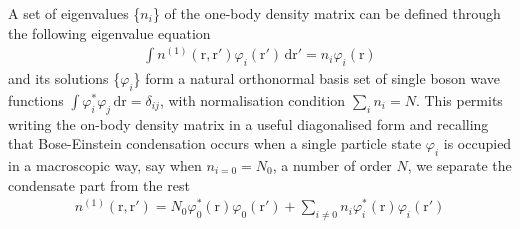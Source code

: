 \documentclass[11pt,a4paper,twoside]{article}
\renewcommand{\vec}[1]{\bm{\mathrm{#1}}}
\begin{document}
			A set of eigenvalues \{$n_i$\} of the one-body density matrix can be defined through the following eigenvalue equation
			\begin{align}
				\int \! n^{(1)}(\vec{r},\vec{r'})\varphi_i(\vec{r'}) \,\mathrm{d}\vec{r'} = n_i\varphi_i(\vec{r})
			\end{align}
			and its solutions \{$\varphi_i$\} form a natural orthonormal basis set of single boson wave functions $\int\!\varphi_i^*\varphi_j\,\mathrm{d}\vec{r}=\delta_{ij}$, with normalisation condition $\sum_i n_i=N$. This permits writing the on-body density matrix in a useful diagonalised form and recalling that Bose-Einstein condensation occurs when a single particle state $\varphi_i$ is occupied in a macroscopic way, say when $n_{i=0}=N_0$, a number of order $N$, we separate the condensate part from the rest
			\begin{align}
				n^{(1)}(\vec{r},\vec{r'}) = N_0\varphi_0^*(\vec{r})\varphi_0(\vec{r'})+\sum_{i\neq0}n_i\varphi_i^*(\vec{r})\varphi_i(\vec{r'}) \label{eq:obdm-diag}
			\end{align}
\end{document}
